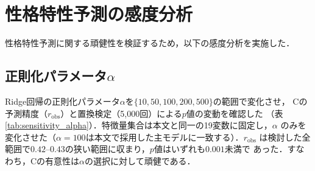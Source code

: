 \documentclass[dvipdfmx,11pt,a4paper]{bxjsarticle}
\renewcommand{\_}{\paperorigunderscore\allowbreak}%
\begin{document}









\section{性格特性予測の感度分析}
\label{sec:appendix_sensitivity}

性格特性予測に関する頑健性を検証するため，以下の感度分析を実施した．

\subsection{正則化パラメータ$\alpha$}
Ridge回帰の正則化パラメータ$\alpha$を$\{10, 50, 100, 200, 500\}$の範囲で変化させ，
Cの予測精度（$r_{\text{obs}}$）と置換検定（5,000回）による$p$値の変動を確認した
（表\ref{tab:sensitivity_alpha}）．特徴量集合は本文と同一の19変数に固定し，$\alpha$
のみを変化させた（$\alpha = 100$は本文で採用した主モデルに一致する）．$r_{\text{obs}}$
は検討した全範囲で$0.42$--$0.43$の狭い範囲に収まり，$p$値はいずれも$0.001$未満で
あった．すなわち，Cの有意性は$\alpha$の選択に対して頑健である．
\end{document}
